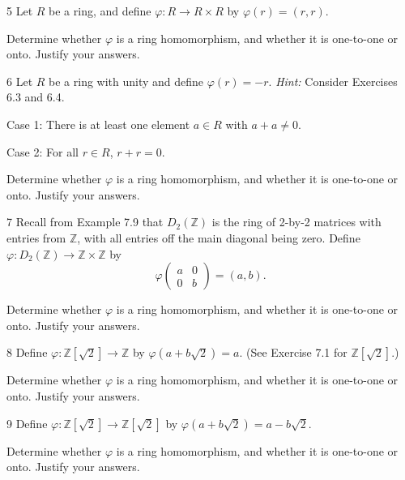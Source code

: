 \begin{problem}{5}
    Let $R$ be a ring, and define $\varphi : R \to R \times R$ by $\varphi(r) = (r, r)$.

    Determine whether $\varphi$ is a ring homomorphism, and whether it is
    one-to-one or onto. Justify your answers.
\end{problem}
\unsolved

\begin{problem}{6}
    Let $R$ be a ring with unity and define $\varphi(r) = -r$. \emph{Hint:} Consider Exercises 6.3 and 6.4.

    Case 1: There is at least one element $a \in R$ with $a + a \neq 0$.

    Case 2: For all $r \in R$, $r + r = 0$.

    Determine whether $\varphi$ is a ring homomorphism, and whether it is
    one-to-one or onto. Justify your answers.
\end{problem}
\unsolved

\begin{problem}{7}
    Recall from Example 7.9 that $D_2(\mathbb{Z})$ is the ring of 2-by-2 matrices with entries from $\mathbb{Z}$, with all entries off the main diagonal being zero. Define $\varphi : D_2(\mathbb{Z}) \to \mathbb{Z} \times \mathbb{Z}$ by
    \[\varphi\begin{pmatrix} a & 0 \\ 0 & b \end{pmatrix} = (a, b).\]

    Determine whether $\varphi$ is a ring homomorphism, and whether it is
    one-to-one or onto. Justify your answers.
\end{problem}
\unsolved

\begin{problem}{8}
    Define $\varphi : \mathbb{Z}[\sqrt{2}] \to \mathbb{Z}$ by $\varphi(a + b\sqrt{2}) = a$. (See Exercise 7.1 for $\mathbb{Z}[\sqrt{2}]$.)

    Determine whether $\varphi$ is a ring homomorphism, and whether it is
    one-to-one or onto. Justify your answers.
\end{problem}
\unsolved

\begin{problem}{9}
    Define $\varphi : \mathbb{Z}[\sqrt{2}] \to \mathbb{Z}[\sqrt{2}]$ by $\varphi(a + b\sqrt{2}) = a - b\sqrt{2}$.

    Determine whether $\varphi$ is a ring homomorphism, and whether it is
    one-to-one or onto. Justify your answers.
\end{problem}
\unsolved

